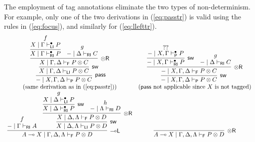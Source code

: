 \documentclass[copyright,creativecommons]{eptcs}
\theoremstyle{definition}
\newcommand{\tr}{\otimes \mathsf{R}}
\newcommand{\lleft}{{\multimap}\mathsf{L}}
\newcommand{\pass}{\mathsf{pass}}
\newcommand{\ot}{\otimes}
\newcommand{\lolli}{\multimap}
\newcommand{\RI}{\mathsf{RI}}
\newcommand{\LI}{\mathsf{LI}}
\newcommand{\Pass}{\mathsf{P}}
\newcommand{\F}{\mathsf{F}}
\begin{document}
The employment of tag annotations eliminate the two types of non-determinism. For example, only one of the two derivations in (\ref{eq:passtr}) is valid using the rules in (\ref{eq:focus}), and similarly for (\ref{eq:llefttr}).
\vspace{-.3cm}
\begin{displaymath}
  \begin{array}{cc}
      \infer[\pass]{{-} \mid X , \Gamma , \Delta \vdash_{\Pass} P \ot C}{
        \infer[\mathsf{sw}]{X \mid \Gamma , \Delta \vdash_{\LI} P \ot C}{
          \infer[\tr]{X \mid \Gamma , \Delta \vdash_{\F} P \ot C}{
            \infer{X \mid \Gamma \vdash^{\bullet}_{\RI} P}{
              \deduce{X \mid \Gamma \vdash^{\bullet}_{\LI} P}{f}
              }
            &
            \deduce{{-} \mid \Delta \vdash_{\RI} C}{g}
          }
        }
      }
    &
    \infer[\mathsf{sw}]{{-} \mid X , \Gamma , \Delta \vdash_{\Pass} P \ot C}{
      \infer[\tr]{{-} \mid X , \Gamma , \Delta \vdash_{\F} P \ot C}{
        \infer[\mathsf{sw}]{{-} \mid X , \Gamma \vdash^{\bullet}_{\RI} P}{
          \deduce{{-} \mid X , \Gamma \vdash^{\bullet}_{\Pass} P}{??}
        }
        &
        \deduce{{-} \mid \Delta \vdash_{\RI} C}{g}
      }
    }
    \\
    (\text{same derivation as in (\ref{eq:passtr})})
    &
    (\text{$\pass$ not applicable since $X$ is not tagged})
    \\[2pt]
      \infer[\lleft]{A \lolli X \mid \Gamma , \Delta , \Lambda \vdash_{\F} P \ot D}{
        \deduce{{-} \mid \Gamma \vdash_{\RI} A}{f}
        &
        \infer[\mathsf{sw}]{X \mid \Delta , \Lambda \vdash_{\LI} P \ot D}{
          \infer[\tr]{X \mid \Delta , \Lambda \vdash_{\F} P \ot D}{
            \infer[\mathsf{sw}]{X \mid \Delta \vdash^{\bullet}_{\RI} P}{
              \deduce{X \mid \Delta \vdash^{\bullet}_{\LI} P}{g}
              }
            &
            \deduce{{-} \mid \Lambda \vdash_{\RI} D}{h}
          }
        }
      }
    &
      \infer[\tr]{A \lolli X \mid \Gamma , \Delta , \Lambda \vdash_{\F} P \ot D}{
}
\end{array}
\end{displaymath}
\end{document}
